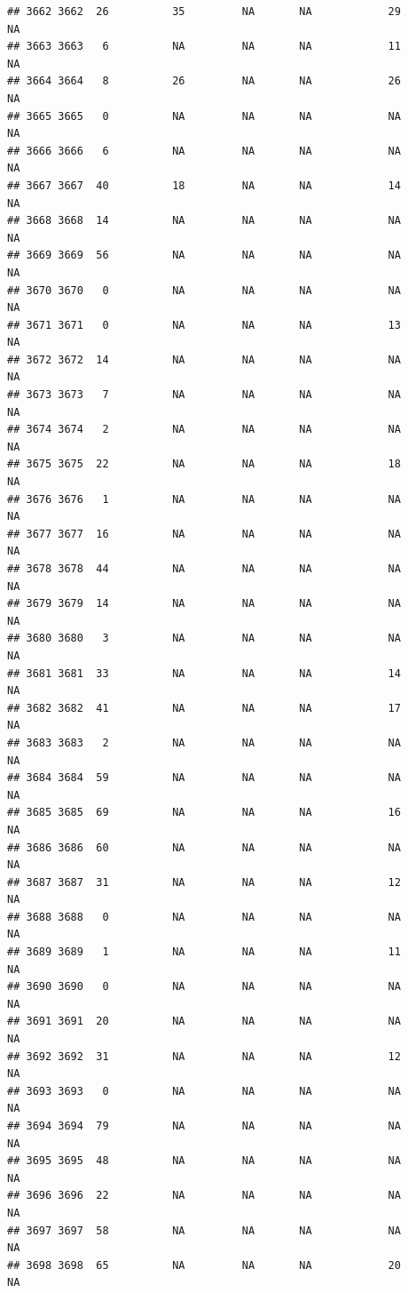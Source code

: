 \documentclass[man]{apa6}
\begin{document}
\begin{verbatim}
## 3662 3662  26          35         NA       NA            29       NA
## 3663 3663   6          NA         NA       NA            11       NA
## 3664 3664   8          26         NA       NA            26       NA
## 3665 3665   0          NA         NA       NA            NA       NA
## 3666 3666   6          NA         NA       NA            NA       NA
## 3667 3667  40          18         NA       NA            14       NA
## 3668 3668  14          NA         NA       NA            NA       NA
## 3669 3669  56          NA         NA       NA            NA       NA
## 3670 3670   0          NA         NA       NA            NA       NA
## 3671 3671   0          NA         NA       NA            13       NA
## 3672 3672  14          NA         NA       NA            NA       NA
## 3673 3673   7          NA         NA       NA            NA       NA
## 3674 3674   2          NA         NA       NA            NA       NA
## 3675 3675  22          NA         NA       NA            18       NA
## 3676 3676   1          NA         NA       NA            NA       NA
## 3677 3677  16          NA         NA       NA            NA       NA
## 3678 3678  44          NA         NA       NA            NA       NA
## 3679 3679  14          NA         NA       NA            NA       NA
## 3680 3680   3          NA         NA       NA            NA       NA
## 3681 3681  33          NA         NA       NA            14       NA
## 3682 3682  41          NA         NA       NA            17       NA
## 3683 3683   2          NA         NA       NA            NA       NA
## 3684 3684  59          NA         NA       NA            NA       NA
## 3685 3685  69          NA         NA       NA            16       NA
## 3686 3686  60          NA         NA       NA            NA       NA
## 3687 3687  31          NA         NA       NA            12       NA
## 3688 3688   0          NA         NA       NA            NA       NA
## 3689 3689   1          NA         NA       NA            11       NA
## 3690 3690   0          NA         NA       NA            NA       NA
## 3691 3691  20          NA         NA       NA            NA       NA
## 3692 3692  31          NA         NA       NA            12       NA
## 3693 3693   0          NA         NA       NA            NA       NA
## 3694 3694  79          NA         NA       NA            NA       NA
## 3695 3695  48          NA         NA       NA            NA       NA
## 3696 3696  22          NA         NA       NA            NA       NA
## 3697 3697  58          NA         NA       NA            NA       NA
## 3698 3698  65          NA         NA       NA            20       NA

\end{verbatim}
\end{document}
